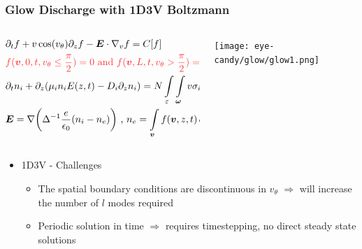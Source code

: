 \documentclass[mathserif, aspectratio=169]{beamer}
\newcommand{\vect}[1]{\boldsymbol{#1}}
\newcommand{\of}[1]{\mleft( #1 \mright)}
\newcommand{\myint}{\int\limits}
\newcommand{\diff}[1]{\, d#1}
\newcommand{\vtheta}{{v_{\theta}}}
\begin{document}
\begin{frame}
	\frametitle{Glow Discharge with 1D3V Boltzmann}
	\begin{columns}
		\begin{column}{0.6\textwidth}
			\footnotesize{
		\begin{align}
			&\partial_t f + v\cos\of{\vtheta} \partial_z f -\vect{E}\cdot\nabla_v f = C[f] \\
			&\textcolor{red!80}{f(\vect{v}, 0, t, \vtheta \leq \frac{\pi}{2})	= 0 \text{ and } f(\vect{v}, L, t, \vtheta > \frac{\pi}{2})	= 0}\\
			&\partial_t n_i + \partial_z \of{\mu_i n_i E\of{z,t} -D_i \partial_z n_i} = N \myint_{\varepsilon}\myint_{\vect{\omega}} v \sigma_i f d\vect{\omega} d\varepsilon \\
			& \vect{E} = \nabla \of{\Delta^{-1}\frac{e}{\epsilon_0} \of{n_i- n_e}} \text{ , } n_e = \myint_{\vect{v}} f\of{\vect{v}, z, t} \diff{\vect{v}}
		\end{align}}
		\end{column}
		\begin{column}{0.4\textwidth}
			\texttt{[image: eye-candy/glow/glow1.png]}
		\end{column}
	\end{columns}


	
	\begin{itemize}
		\item 1D3V - Challenges
		\begin{itemize}
			\item The spatial boundary conditions are discontinuous in $\vtheta$ $\Rightarrow$ will increase the number of $l$ modes required
			\item Periodic solution in time $\Rightarrow$ requires timestepping, no direct steady state solutions
		\end{itemize}
	\end{itemize}
\end{frame}
\end{document}
